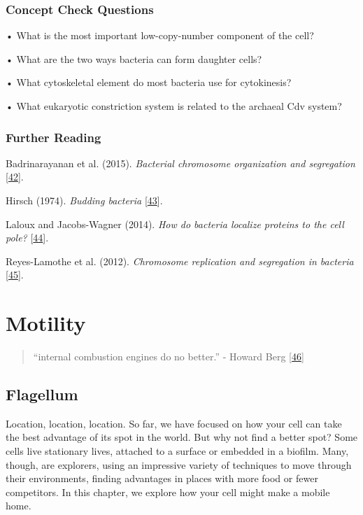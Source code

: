 \documentclass[]{tufte-book}
\begin{document}
\hypertarget{concept-check-questions-4}{%
\subsection*{Concept Check Questions}\label{concept-check-questions-4}}

• What is the most important low-copy-number component of the cell?

• What are the two ways bacteria can form daughter cells?

• What cytoskeletal element do most bacteria use for cytokinesis?

• What eukaryotic constriction system is related to the archaeal Cdv system?

\hypertarget{further-reading-4}{%
\subsection*{Further Reading}\label{further-reading-4}}

Badrinarayanan et al. (2015). \emph{Bacterial chromosome organization and segregation} {[}\protect\hyperlink{ref-badrinarayanan2015}{42}{]}.

Hirsch (1974). \emph{Budding bacteria} {[}\protect\hyperlink{ref-hirsch1974}{43}{]}.

Laloux and Jacobs-Wagner (2014). \emph{How do bacteria localize proteins to the cell pole?} {[}\protect\hyperlink{ref-laloux2014}{44}{]}.

Reyes-Lamothe et al. (2012). \emph{Chromosome replication and segregation in bacteria} {[}\protect\hyperlink{ref-reyes-lamothe2012}{45}{]}.

\hypertarget{motility}{%
\chapter{Motility}\label{motility}}

\begin{quote}
``internal combustion engines do no better.''
- Howard Berg {[}\protect\hyperlink{ref-berg1988}{46}{]}
\end{quote}

\hypertarget{flagellum}{%
\section{Flagellum}\label{flagellum}}

Location, location, location. So far, we have focused on how your cell can take the best advantage of its spot in the world. But why not find a better spot? Some cells live stationary lives, attached to a surface or embedded in a biofilm. Many, though, are explorers, using an impressive variety of techniques to move through their environments, finding advantages in places with more food or fewer competitors. In this chapter, we explore how your cell might make a mobile home.
\end{document}
